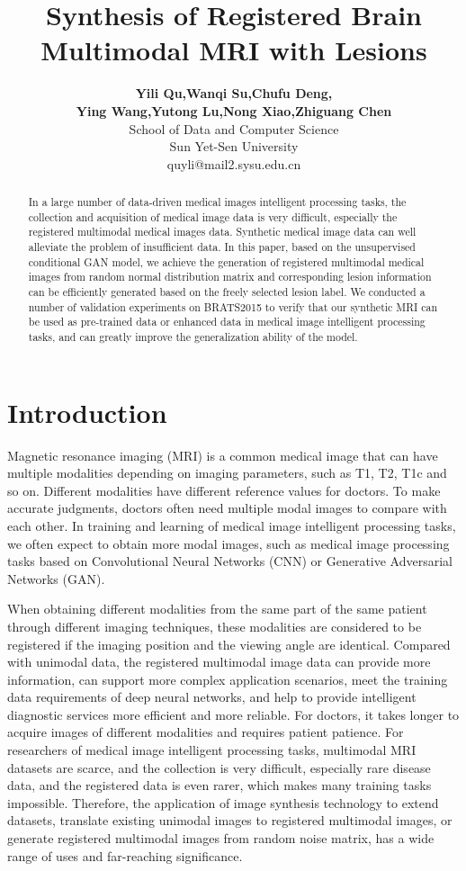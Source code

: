 \documentclass[letterpaper]{article} %
\title{Synthesis of Registered Brain Multimodal MRI with Lesions}
\author{\Large \textbf{Yili Qu,Wanqi Su,Chufu Deng,}\\ \Large \textbf{Ying Wang,Yutong Lu,Nong Xiao,Zhiguang Chen}\\  %
School of Data and Computer Science\\ Sun Yet-Sen University\\	
quyli@mail2.sysu.edu.cn%
}
\begin{document}
\maketitle

\begin{abstract}
In a large number of data-driven medical images intelligent processing tasks, the collection and acquisition of medical image data is very difficult, especially the registered multimodal medical images data. Synthetic medical image data can well alleviate the problem of insufficient data. In this paper, based on the unsupervised conditional GAN model, we achieve the generation of registered multimodal medical images from random normal distribution matrix and corresponding lesion information can be efficiently generated based on the freely selected lesion label. We conducted a number of validation experiments on BRATS2015 to verify that our synthetic MRI can be used as pre-trained data or enhanced data in medical image intelligent processing tasks, and can greatly improve the generalization ability of the model.
\end{abstract}
	
\section{Introduction}
Magnetic resonance imaging (MRI) is a common medical image that can have multiple modalities depending on imaging parameters, such as T1, T2, T1c and so on. Different modalities have different reference values for doctors. To make accurate judgments, doctors often need multiple modal images to compare with each other. In training and learning of medical image intelligent processing tasks, we often expect to obtain more modal images, such as medical image processing tasks based on Convolutional Neural Networks (CNN)\cite{86krizhevsky2012imagenet} or Generative Adversarial Networks (GAN)\cite{25goodfellow2014generative}. 

When obtaining different modalities from the same part of the same patient  through different imaging techniques, these modalities are considered to be registered if the imaging position and the viewing angle are identical.  Compared with unimodal data, the registered multimodal image data can provide more information, can support more complex application scenarios, meet the training data requirements of deep neural networks, and help to provide  intelligent diagnostic services more efficient and more reliable. For doctors, it takes longer to acquire images of different modalities and requires patient patience. For researchers of medical image intelligent processing tasks, multimodal MRI datasets are scarce, and the collection is very difficult, especially rare disease data, and the registered data is even rarer, which makes many training tasks impossible. Therefore, the application of image synthesis technology to extend datasets, translate existing unimodal images to registered multimodal images, or generate registered multimodal images from random noise matrix, has a wide range of uses and far-reaching significance.
\end{document}
